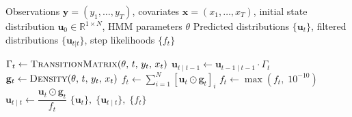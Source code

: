 \begin{algorithm}[H]
\caption{Recursive Filtering Forward Algorithm}
\label{alg:forward}
\begin{algorithmic}[1]
\Require Observations $\mathbf{y} = (y_1, \ldots, y_T)$,
         covariates $\mathbf{x} = (x_1, \ldots, x_T)$,
         initial state distribution $\mathbf{u}_0 \in \mathbb{R}^{1 \times N}$,
         HMM parameters $\theta$
\Ensure Predicted distributions $\{\mathbf{u}_t\}$,
        filtered distributions $\{\mathbf{u}_{t|t}\}$,
        step likelihoods $\{f_t\}$

    \State $\Gamma_t \leftarrow \textsc{TransitionMatrix}(\theta,\, t,\, y_t,\, x_t)$
    \State $\mathbf{u}_{t \mid t - 1} \leftarrow \mathbf{u}_{t-1 \mid t-1} \cdot \Gamma_t$
    \State $\mathbf{g}_t \leftarrow \textsc{Density}(\theta,\, t,\, y_t,\, x_t)$
    \State $f_t \leftarrow \displaystyle\sum_{i=1}^{N} [\mathbf{u}_t \odot \mathbf{g}_t]_i$
    \State $f_t \leftarrow \max(f_t,\; 10^{-10})$
    \State $\mathbf{u}_{t \mid t} \leftarrow \dfrac{\mathbf{u}_t \odot \mathbf{g}_t}{f_t}$
\EndFor
\State \Return $\{\mathbf{u}_t\},\; \{\mathbf{u}_{t \mid t}\},\; \{f_t\}$
\end{algorithmic}
\end{algorithm}


